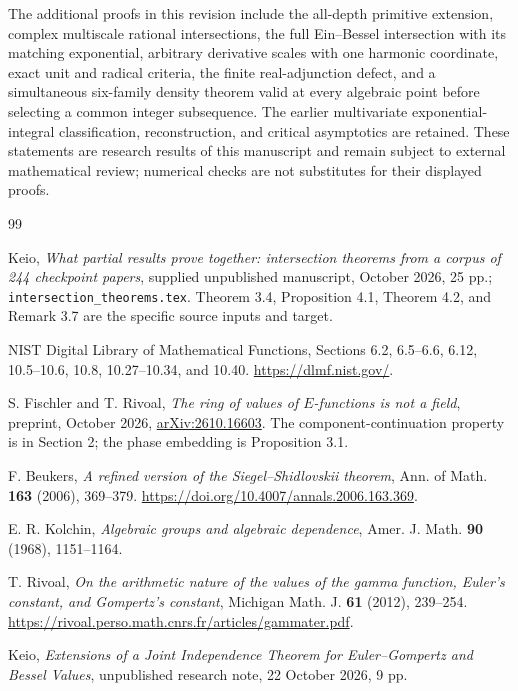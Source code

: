 \documentclass[11pt]{article}
\theoremstyle{definition}
\theoremstyle{remark}
\begin{document}
The additional proofs in this revision include the all-depth primitive
extension, complex multiscale rational intersections, the full
Ein--Bessel intersection with its matching exponential, arbitrary
derivative scales with one harmonic coordinate, exact unit and radical
criteria, the finite real-adjunction defect, and a simultaneous six-family
density theorem valid at every algebraic point before selecting a common
integer subsequence. The earlier multivariate exponential-integral
classification, reconstruction, and critical asymptotics are retained.
These
statements are research results of this manuscript and remain subject
to external mathematical review; numerical checks are not substitutes
for their displayed proofs.


\clearpage
\begin{thebibliography}{99}
\footnotesize\raggedright
\setlength{\itemsep}{3pt}
\setlength{\parskip}{0pt}
Keio, \emph{What partial results prove together:
intersection theorems from a corpus of 244 checkpoint papers},
supplied unpublished manuscript, October 2026, 25 pp.;
\texttt{intersection\_theorems.tex}. Theorem 3.4, Proposition 4.1,
Theorem 4.2, and Remark 3.7 are the specific source inputs and target.

NIST Digital Library of Mathematical Functions, Sections 6.2, 6.5--6.6, 6.12, 10.5--10.6, 10.8, 10.27--10.34, and 10.40. \url{https://dlmf.nist.gov/}.

S. Fischler and T. Rivoal, \emph{The ring of values of $E$-functions
is not a field}, preprint, October 2026,
\href{https://arxiv.org/abs/2610.16603}{arXiv:2610.16603}.
The component-continuation property is in Section 2; the phase
embedding is Proposition 3.1.

F. Beukers,
\emph{A refined version of the Siegel--Shidlovskii theorem},
Ann. of Math. \textbf{163} (2006), 369--379.
\url{https://doi.org/10.4007/annals.2006.163.369}.

E. R. Kolchin,
\emph{Algebraic groups and algebraic dependence},
Amer. J. Math. \textbf{90} (1968), 1151--1164.

T. Rivoal,
\emph{On the arithmetic nature of the values of the gamma function,
Euler's constant, and Gompertz's constant},
Michigan Math. J. \textbf{61} (2012), 239--254.
\url{https://rivoal.perso.math.cnrs.fr/articles/gammater.pdf}.

Keio,
\emph{Extensions of a Joint Independence Theorem for Euler--Gompertz
and Bessel Values}, unpublished research note, 22 October 2026, 9 pp.


\end{thebibliography}
\end{document}
